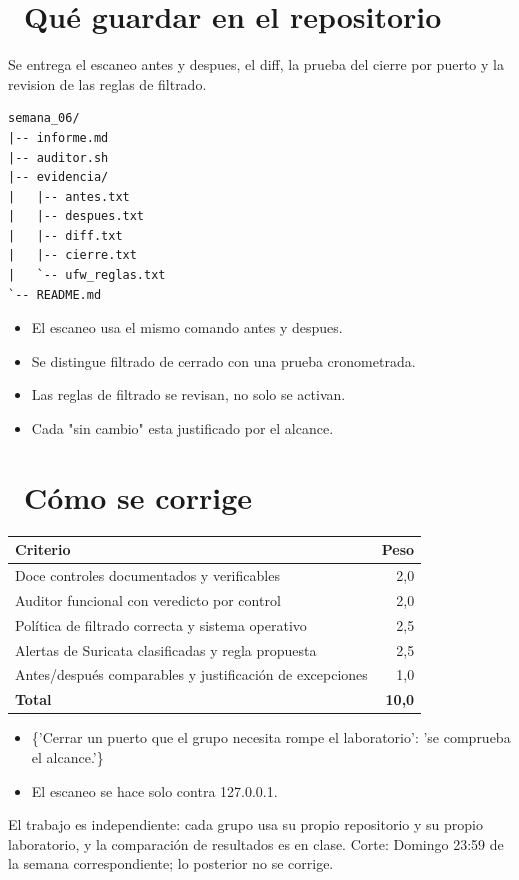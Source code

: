\documentclass[11pt,a4paper]{article}
\newcommand{\iconotexto}[2]{\textcolor{cyanNeon}{\faIcon{#1}}~#2}
\begin{document}
\section{\iconotexto{box-open}{Qué guardar en el repositorio}}

Se entrega el escaneo antes y despues, el diff, la prueba del cierre por puerto y la revision de las reglas de filtrado.

\begin{lstlisting}[style=estiloCodigo]
semana_06/
|-- informe.md
|-- auditor.sh
|-- evidencia/
|   |-- antes.txt
|   |-- despues.txt
|   |-- diff.txt
|   |-- cierre.txt
|   `-- ufw_reglas.txt
`-- README.md
\end{lstlisting}

\begin{itemize}[leftmargin=1.4em,itemsep=2pt,topsep=3pt]
  \item El escaneo usa el mismo comando antes y despues.
  \item Se distingue filtrado de cerrado con una prueba cronometrada.
  \item Las reglas de filtrado se revisan, no solo se activan.
  \item Cada "sin cambio" esta justificado por el alcance.
\end{itemize}

\section{\iconotexto{ruler-combined}{Cómo se corrige}}

\begin{tabularx}{\linewidth}{@{}X r@{}}
\toprule
Criterio & Peso\\
\midrule
Doce controles documentados y verificables & 2,0 \\
Auditor funcional con veredicto por control & 2,0 \\
Política de filtrado correcta y sistema operativo & 2,5 \\
Alertas de Suricata clasificadas y regla propuesta & 2,5 \\
Antes/después comparables y justificación de excepciones & 1,0 \\
\midrule
\textbf{Total} & \textbf{10,0}\\
\bottomrule
\end{tabularx}

\begin{itemize}[leftmargin=1.4em,itemsep=2pt,topsep=3pt]
  \item \{'Cerrar un puerto que el grupo necesita rompe el laboratorio': 'se comprueba el alcance.'\}
  \item El escaneo se hace solo contra 127.0.0.1.
\end{itemize}

\begin{cajaRecuerda}El trabajo es independiente: cada grupo usa su propio repositorio y su propio laboratorio, y la comparación de resultados es en clase. Corte: Domingo 23:59 de la semana correspondiente; lo posterior no se corrige.
\end{cajaRecuerda}
\end{document}
